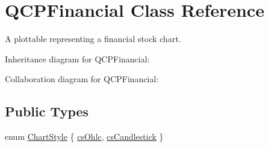 \hypertarget{class_q_c_p_financial}{}\section{Q\+C\+P\+Financial Class Reference}
\label{class_q_c_p_financial}


A plottable representing a financial stock chart.  




Inheritance diagram for Q\+C\+P\+Financial\+:


Collaboration diagram for Q\+C\+P\+Financial\+:
\subsection*{Public Types}
\begin{DoxyCompactItemize}
\item 
enum \hyperlink{class_q_c_p_financial_a0f800e21ee98d646dfc6f8f89d10ebfb}{Chart\+Style} \{ \hyperlink{class_q_c_p_financial_a0f800e21ee98d646dfc6f8f89d10ebfba3a516016c9298d3e95dd82aa203c4390}{cs\+Ohlc}, 
\hyperlink{class_q_c_p_financial_a0f800e21ee98d646dfc6f8f89d10ebfbac803cbd39f26e3f206bcc7028679e62f}{cs\+Candlestick}
 \}
\end{DoxyCompactItemize}
